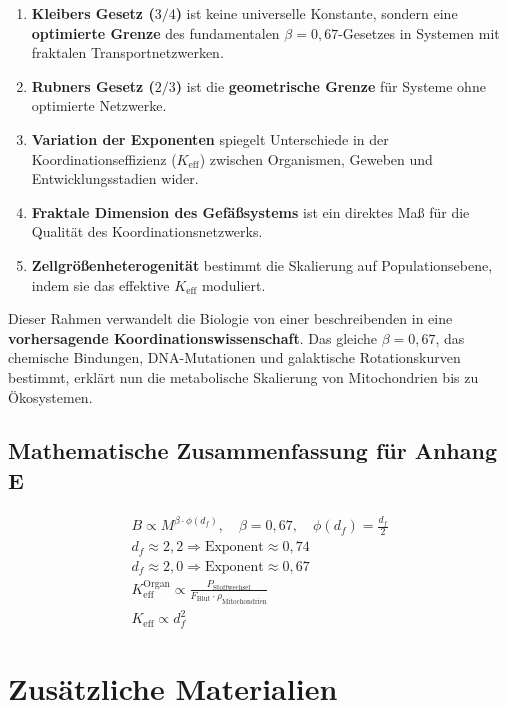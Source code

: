 \documentclass[12pt]{article}
\newcommand{\Keff}{K_{\mathrm{eff}}}
\begin{document}
	\begin{enumerate}
		\item \textbf{Kleibers Gesetz (\(3/4\))} ist keine universelle Konstante, sondern eine \textbf{optimierte Grenze} des fundamentalen \(\beta = 0,67\)-Gesetzes in Systemen mit fraktalen Transportnetzwerken.
		\item \textbf{Rubners Gesetz (\(2/3\))} ist die \textbf{geometrische Grenze} für Systeme ohne optimierte Netzwerke.
		\item \textbf{Variation der Exponenten} spiegelt Unterschiede in der Koordinationseffizienz (\(\Keff\)) zwischen Organismen, Geweben und Entwicklungsstadien wider.
		\item \textbf{Fraktale Dimension des Gefäßsystems} ist ein direktes Maß für die Qualität des Koordinationsnetzwerks.
		\item \textbf{Zellgrößenheterogenität} bestimmt die Skalierung auf Populationsebene, indem sie das effektive \(\Keff\) moduliert.
	\end{enumerate}
	
	Dieser Rahmen verwandelt die Biologie von einer beschreibenden in eine \textbf{vorhersagende Koordinationswissenschaft}. Das gleiche \(\beta = 0,67\), das chemische Bindungen, DNA-Mutationen und galaktische Rotationskurven bestimmt, erklärt nun die metabolische Skalierung von Mitochondrien bis zu Ökosystemen.
	
	\subsection{Mathematische Zusammenfassung für Anhang E}
	
	\begin{align}
		\boxed{B \propto M^{\beta \cdot \phi(d_f)},\quad \beta = 0,67,\quad \phi(d_f) = \frac{d_f}{2}} \\
		\boxed{d_f \approx 2,2 \Rightarrow \text{Exponent} \approx 0,74} \\
		\boxed{d_f \approx 2,0 \Rightarrow \text{Exponent} \approx 0,67} \\
		\boxed{\Keff^{\text{Organ}} \propto \frac{P_{\text{Stoffwechsel}}}{F_{\text{Blut}} \cdot \rho_{\text{Mitochondrien}}}} \\
		\boxed{\Keff \propto d_f^{2}}
	\end{align}
	
	\appendix
	\section{Zusätzliche Materialien}
	
\end{document}
